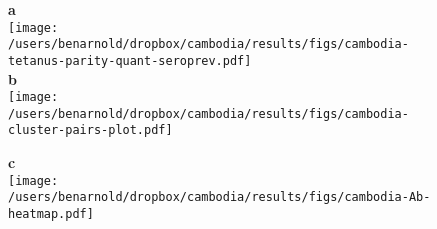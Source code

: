 \documentclass[10pt]{article}
\title{}
\author{}
\date{}
\begin{document}





\begin{figure}[htbp]
\begin{flushleft}

{\Large \textbf{a}} \\
\vspace{-10pt}
\texttt{[image: /users/benarnold/dropbox/cambodia/results/figs/cambodia-tetanus-parity-quant-seroprev.pdf]} \\

\vspace{5pt}
{\Large \textbf{b}} \\
\vspace{-25pt}
\texttt{[image: /users/benarnold/dropbox/cambodia/results/figs/cambodia-cluster-pairs-plot.pdf]} \\
\vspace{-5pt}

{\Large \textbf{c}} \\ 
\vspace{-15pt}
\texttt{[image: /users/benarnold/dropbox/cambodia/results/figs/cambodia-Ab-heatmap.pdf]} \\

\begin{minipage}{\textwidth}
\caption{}
\label{fig:tetpairsheat}
\end{minipage}
\end{flushleft}
\end{figure}
\end{document}
